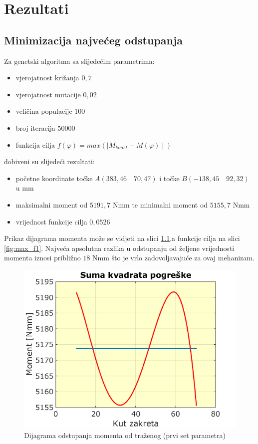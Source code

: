 \chapter{Rezultati}


\section{Minimizacija najvećeg odstupanja}
\quad Za genetski algoritma sa slijedećim parametrima: 
\begin{itemize}
\item vjerojatnost križanja $0,7$
\item vjerojatnost mutacije $0,02$
\item veličina populacije $100$
\item broj iteracija $50000$
\item funkcija cilja $f(\varphi)=max\left( \mid M_{konst}-M(\varphi)\mid\right) $
\end{itemize}
dobiveni su slijedeći rezultati:
\begin{itemize}
\item početne koordinate točke $A(383,46\quad 70,47)$ i točke $B(-138,45\quad  92,32)$ u mm
\item maksimalni moment od $5191,7$ Nmm te minimalni moment od $5155,7$  Nmm
\item vrijednost funkcije cilja $0,0526$
\end{itemize}

Prikaz dijagrama momenta može se vidjeti na slici \ref{fig:max_m1},a funkcije cilja na slici \ref{fig:max_f1}. Najveća apsolutna razlika u odstupanju od željene vrijednosti momenta iznosi približno $18$ Nmm što je vrlo zadovoljavajuće za ovaj mehanizam.


\begin{figure}[h!]
\center
\includegraphics[scale=.6]{slike/max_m1.png}
\caption{Dijagrama odstupanja momenta od traženog (prvi set parametra)}
\label{fig:max_m1}
\end{figure}

